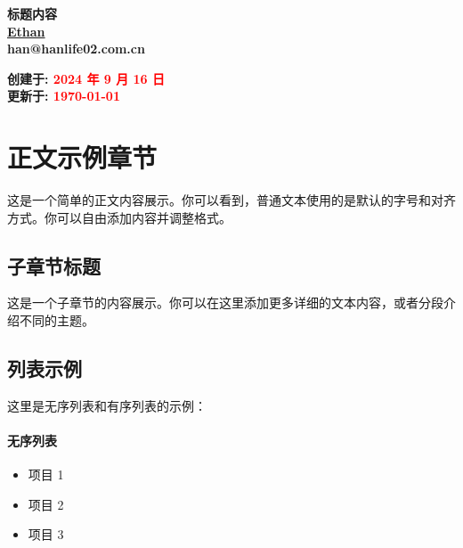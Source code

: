 
\begin{flushright}
    \vspace*{7cm}  %
    \Huge\bfseries  %
    \textcolor{blackk}{\textbf{标题内容}}\\[1cm]  %
    \huge\bfseries  %
    \href{https://hanlife02.com.cn/}{\textcolor{blackk}{Ethan}}\\[1cm]  %
    \huge\bfseries
    \textcolor{blackk}{han@hanlife02.com.cn}\\[1cm]
\end{flushright}

\begin{flushleft}
    \vspace*{7.5cm}
    \large\bfseries  %
    \textcolor{blackk}{创建于:}
    \textcolor{red}{2024 年 9 月 16 日}\\[1cm]
    \large\bfseries 
    \textcolor{blackk}{更新于:}
    \textcolor{red}{\today}
\end{flushleft}

\newpage

\tableofcontents
\newpage

\section{正文示例章节}

这是一个简单的正文内容展示。你可以看到，普通文本使用的是默认的字号和对齐方式。你可以自由添加内容并调整格式。

\subsection{子章节标题}

这是一个子章节的内容展示。你可以在这里添加更多详细的文本内容，或者分段介绍不同的主题。

\subsection{列表示例}

这里是无序列表和有序列表的示例：

\paragraph{无序列表}
\begin{itemize}
    \item 项目 1
    \item 项目 2
    \item 项目 3
\end{itemize}

